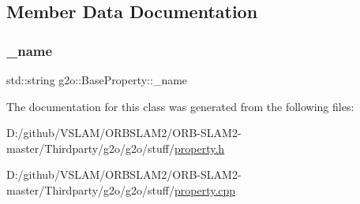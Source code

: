 \subsection{Member Data Documentation}
\mbox{\label{classg2o_1_1_base_property_a74e4bbf35ddf26022cb39be2ea7abd2b}} 
\subsubsection{\texorpdfstring{\+\_\+name}{\_name}}
{\footnotesize\ttfamily std\+::string g2o\+::\+Base\+Property\+::\+\_\+name\hspace{0.3cm}{\ttfamily [protected]}}



The documentation for this class was generated from the following files\+:\begin{DoxyCompactItemize}
\item 
D\+:/github/\+V\+S\+L\+A\+M/\+O\+R\+B\+S\+L\+A\+M2/\+O\+R\+B-\/\+S\+L\+A\+M2-\/master/\+Thirdparty/g2o/g2o/stuff/\mbox{\hyperlink{property_8h}{property.\+h}}\item 
D\+:/github/\+V\+S\+L\+A\+M/\+O\+R\+B\+S\+L\+A\+M2/\+O\+R\+B-\/\+S\+L\+A\+M2-\/master/\+Thirdparty/g2o/g2o/stuff/\mbox{\hyperlink{property_8cpp}{property.\+cpp}}\end{DoxyCompactItemize}
